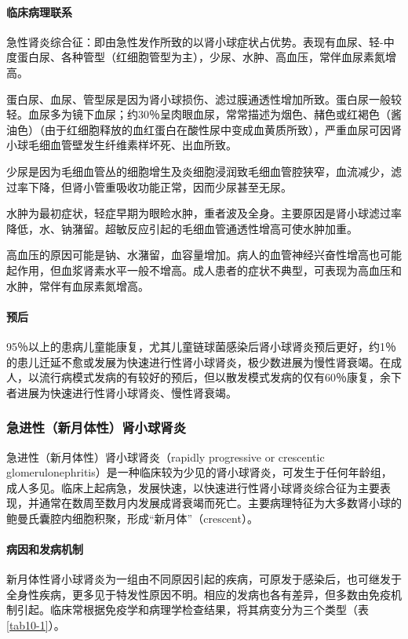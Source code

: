\paragraph{临床病理联系}
急性肾炎综合征：即由急性发作所致的以肾小球症状占优势。表现有血尿、轻-中度蛋白尿、各种管型（红细胞管型为主），少尿、水肿、高血压，常伴血尿素氮增高。

蛋白尿、血尿、管型尿是因为肾小球损伤、滤过膜通透性增加所致。蛋白尿一般较轻。血尿多为镜下血尿；约30％呈肉眼血尿，常常描述为烟色、赭色或红褐色（酱油色）（由于红细胞释放的血红蛋白在酸性尿中变成血黄质所致），严重血尿可因肾小球毛细血管壁发生纤维素样坏死、出血所致。

少尿是因为毛细血管丛的细胞增生及炎细胞浸润致毛细血管腔狭窄，血流减少，滤过率下降，但肾小管重吸收功能正常，因而少尿甚至无尿。

水肿为最初症状，轻症早期为眼睑水肿，重者波及全身。主要原因是肾小球滤过率降低，水、钠潴留。超敏反应引起的毛细血管通透性增高可使水肿加重。

高血压的原因可能是钠、水潴留，血容量增加。病人的血管神经兴奋性增高也可能起作用，但血浆肾素水平一般不增高。成人患者的症状不典型，可表现为高血压和水肿，常伴有血尿素氮增高。

\paragraph{预后}
95％以上的患病儿童能康复，尤其儿童链球菌感染后肾小球肾炎预后更好，约1％的患儿迁延不愈或发展为快速进行性肾小球肾炎，极少数进展为慢性肾衰竭。在成人，以流行病模式发病的有较好的预后，但以散发模式发病的仅有60％康复，余下者进展为快速进行性肾小球肾炎、慢性肾衰竭。

\subsubsection{急进性（新月体性）肾小球肾炎}

急进性（新月体性）肾小球肾炎（rapidly progressive or crescentic
glomerulonephritis）是一种临床较为少见的肾小球肾炎，可发生于任何年龄组，成人多见。临床上起病急，发展快速，以快速进行性肾小球肾炎综合征为主要表现，并通常在数周至数月内发展成肾衰竭而死亡。主要病理特征为大多数肾小球的鲍曼氏囊腔内细胞积聚，形成“新月体”（crescent）。

\paragraph{病因和发病机制}
新月体性肾小球肾炎为一组由不同原因引起的疾病，可原发于感染后，也可继发于全身性疾病，更多见于特发性原因不明。相应的发病也各有差异，但多数由免疫机制引起。临床常根据免疫学和病理学检查结果，将其病变分为三个类型（表\ref{tab10-1}）。


